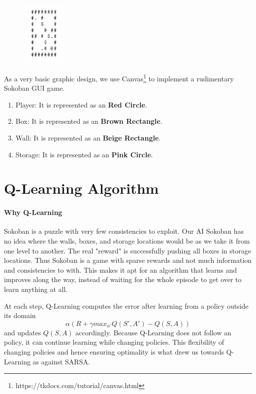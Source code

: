 \documentclass{article}
\begin{document}
{
\begin{figure} %
    \centering
    \includegraphics[width=0.19\textwidth]{board.png}
\end{figure}

As a very basic graphic design, we use Canvas\footnote{https://tkdocs.com/tutorial/canvas.html} to implement a rudimentary Sokoban GUI game. 

\begin{enumerate}[label=\alph*)]
    \item Player: It is represented as an \textbf{Red Circle}.
    \item Box: It is represented as an \textbf{Brown Rectangle}.
    \item Wall: It is represented as an \textbf{Beige Rectangle}.
    \item Storage: It is represented as an \textbf{Pink Circle}.
\end{enumerate}
}

\section{Q-Learning Algorithm}

\paragraph{Why Q-Learning}
Sokoban is a puzzle with very few consistencies to exploit. Our AI Sokoban has no idea where the walls, boxes, and storage locations would be as we take it from one level to another. The real "reward" is successfully pushing all boxes in storage locations. Thus Sokoban is a game with sparse rewards and not much information and consistencies to with. This makes it apt for an algorithm that learns and improves along the way, instead of waiting for the whole episode to get over to learn anything at all.

At each step, Q-Learning computes the error after learning from a policy outside its domain $$\alpha(R + \gamma max_{\alpha'}Q(S',A') - Q(S,A))$$ 
and updates $Q(S,A)$ accordingly. Because Q-Learning does not follow an policy, it can continue learning while changing policies. This flexibility of changing policies and hence ensuring optimality is what drew us towards Q-Learning as against SARSA. 
\end{document}
